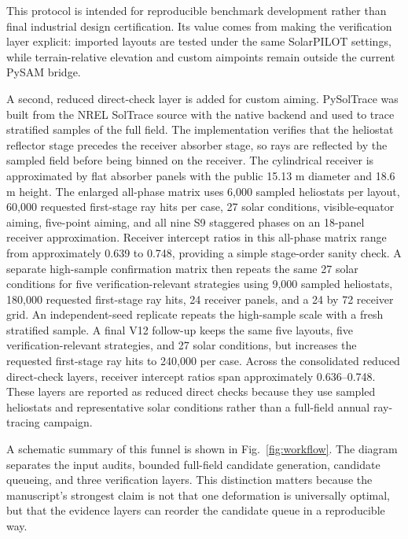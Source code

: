 \documentclass[final,3p,times]{elsarticle}
\begin{document}
This protocol is intended for reproducible benchmark development rather than final industrial design certification. Its value comes from making the verification layer explicit: imported layouts are tested under the same SolarPILOT settings, while terrain-relative elevation and custom aimpoints remain outside the current PySAM bridge.

A second, reduced direct-check layer is added for custom aiming. PySolTrace was built from the NREL SolTrace source with the native  backend and used to trace stratified samples of the full field. The implementation verifies that the heliostat reflector stage precedes the receiver absorber stage, so rays are reflected by the sampled field before being binned on the receiver. The cylindrical receiver is approximated by flat absorber panels with the public 15.13 m diameter and 18.6 m height. The enlarged all-phase matrix uses 6,000 sampled heliostats per layout, 60,000 requested first-stage ray hits per case, 27 solar conditions, visible-equator aiming, five-point aiming, and all nine S9 staggered phases on an 18-panel receiver approximation. Receiver intercept ratios in this all-phase matrix range from approximately 0.639 to 0.748, providing a simple stage-order sanity check. A separate high-sample confirmation matrix then repeats the same 27 solar conditions for five verification-relevant strategies using 9,000 sampled heliostats, 180,000 requested first-stage ray hits, 24 receiver panels, and a 24 by 72 receiver grid. An independent-seed replicate repeats the high-sample scale with a fresh stratified sample. A final V12 follow-up keeps the same five layouts, five verification-relevant strategies, and 27 solar conditions, but increases the requested first-stage ray hits to 240,000 per case. Across the consolidated reduced direct-check layers, receiver intercept ratios span approximately 0.636--0.748. These layers are reported as reduced direct checks because they use sampled heliostats and representative solar conditions rather than a full-field annual ray-tracing campaign.

A schematic summary of this funnel is shown in Fig.~\ref{fig:workflow}. The diagram separates the input audits, bounded full-field candidate generation, candidate queueing, and three verification layers. This distinction matters because the manuscript's strongest claim is not that one deformation is universally optimal, but that the evidence layers can reorder the candidate queue in a reproducible way.
\end{document}
